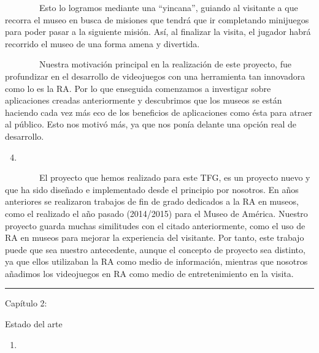 \documentclass[]{article}
\begin{document}
~~~~~~~~Esto lo logramos mediante una ``yincana'', guiando al visitante
a que recorra el museo en busca de misiones que tendrá que ir
completando minijuegos para poder pasar a la siguiente misión. Así, al
finalizar la visita, el jugador habrá recorrido el museo de una forma
amena y divertida.

~~~~~~~~Nuestra motivación principal en la realización de este proyecto,
fue profundizar en el desarrollo de videojuegos con una herramienta tan
innovadora como lo es la RA. Por lo que enseguida comenzamos a
investigar sobre aplicaciones creadas anteriormente y descubrimos que
los museos se están haciendo cada vez más eco de los beneficios de
aplicaciones como ésta para atraer al público. Esto nos motivó más, ya
que nos ponía delante una opción real de desarrollo.

\begin{enumerate}
\setcounter{enumi}{3}
\item
\end{enumerate}

~~~~~~~~El proyecto que hemos realizado para este TFG, es un proyecto
nuevo y que ha sido diseñado e implementado desde el principio por
nosotros. En años anteriores se realizaron trabajos de fin de grado
dedicados a la RA en museos, como el realizado el año pasado (2014/2015)
para el Museo de América. Nuestro proyecto guarda muchas similitudes con
el citado anteriormente, como el uso de RA en museos para mejorar la
experiencia del visitante. Por tanto, este trabajo puede que sea nuestro
antecedente, aunque el concepto de proyecto sea distinto, ya que ellos
utilizaban la RA como medio de información, mientras que nosotros
añadimos los videojuegos en RA como medio de entretenimiento en la
visita.

\begin{center}\rule{3in}{0.4pt}\end{center}

Capítulo 2:

Estado del arte

\begin{enumerate}
\item
\end{enumerate}
\end{document}
